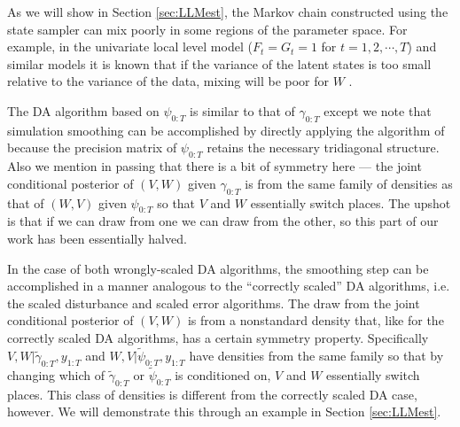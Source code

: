 \documentclass{article}
\begin{document}
As we will show in Section \ref{sec:LLMest}, the Markov chain constructed using the state sampler can mix poorly in some regions of the parameter space. For example, in the univariate local level model ($F_t=G_t=1$ for $t=1,2,\cdots,T$) and similar models it is known that if the variance of the latent states is too small relative to the variance of the data, mixing will be poor for $W$ \cite{fruhwirth2004efficient}.

The DA algorithm based on $\psi_{0:T}$ is similar to that of $\gamma_{0:T}$ except we note that simulation smoothing can be accomplished by directly applying the algorithm of  because the precision matrix of $\psi_{0:T}$ retains the necessary tridiagonal structure. Also we mention in passing that there is a bit of symmetry here --- the joint conditional posterior of $(V,W)$ given $\gamma_{0:T}$ is from the same family of densities as that of $(W,V)$ given $\psi_{0:T}$ so that $V$ and $W$ essentially switch places. The upshot is that if we can draw from one we can draw from the other, so this part of our work has been essentially halved.


In the case of both wrongly-scaled DA algorithms, the smoothing step can be accomplished in a manner analogous to the ``correctly scaled'' DA algorithms, i.e. the scaled disturbance and scaled error algorithms. The draw from the joint conditional posterior of $(V,W)$ is from a nonstandard density that, like for the correctly scaled DA algorithms, has a certain symmetry property. Specifically $V,W|\tilde{\gamma}_{0:T},y_{1:T}$ and $W,V|\tilde{\psi}_{0:T},y_{1:T}$ have densities from the same family so that by changing which of $\tilde{\gamma}_{0:T}$ or $\tilde{\psi}_{0:T}$ is conditioned on, $V$ and $W$ essentially switch places. This class of densities is different from the correctly scaled DA case, however. We will demonstrate this through an example in Section \ref{sec:LLMest}.
\end{document}
